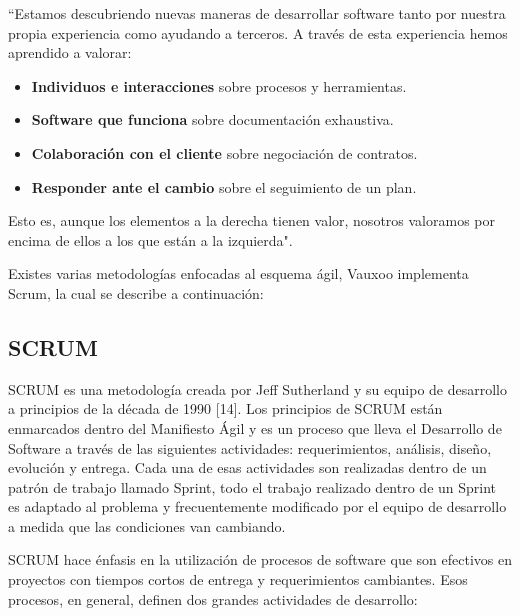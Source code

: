 \documentclass[a4paper, 12pt]{article}
\begin{document}
``Estamos descubriendo nuevas maneras de desarrollar software tanto por nuestra propia experiencia como ayudando a terceros. A través de esta experiencia hemos aprendido a valorar:

\begin{itemize}
\item \textbf{Individuos e interacciones} sobre procesos y herramientas.
\item \textbf{Software que funciona} sobre documentación exhaustiva.
\item \textbf{Colaboración con el cliente} sobre negociación de contratos.
\item \textbf{Responder ante el cambio} sobre el seguimiento de un plan.
\end{itemize}

Esto es, aunque los elementos a la derecha tienen valor, nosotros valoramos por encima de ellos a los que están a la izquierda".

Existes varias metodologías enfocadas al esquema ágil, Vauxoo implementa Scrum, la cual se describe a continuación:

\subsection{SCRUM}

SCRUM es una metodología creada por Jeff Sutherland y su equipo de desarrollo a principios de la década de 1990 [14]. Los principios de SCRUM están enmarcados dentro del Manifiesto Ágil y es un proceso que lleva el Desarrollo de Software a través de las siguientes actividades: requerimientos, análisis, diseño, evolución y entrega. Cada una de esas actividades son realizadas dentro de un patrón de trabajo llamado Sprint, todo el trabajo realizado dentro de un Sprint es adaptado al problema y frecuentemente modificado por el equipo de desarrollo a medida que las condiciones van cambiando.

SCRUM hace énfasis en la utilización de procesos de software que son efectivos en proyectos con tiempos cortos de entrega y requerimientos cambiantes. Esos procesos, en general, definen dos grandes actividades de desarrollo:
\end{document}
